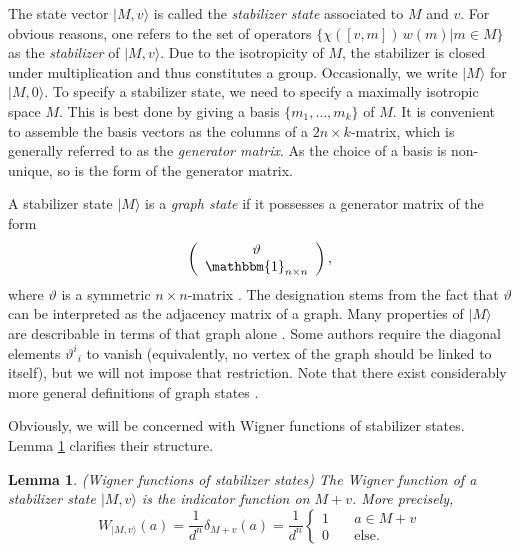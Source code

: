 \documentclass[aps,twocolumn,floatfix]{revtex4}
\newtheorem{lemma}[theorem]{Lemma}
\def\ket#1.{|#1\rangle}
\def\Id{\mathbbm{1}}
\begin{document}
The state vector $\ket M,v.$ is called the \emph{stabilizer state}
associated to $M$ and $v$. For obvious reasons, one refers to the set
of operators $\{\chi([v,m])\,w(m)|m\in M\}$ as the \emph{stabilizer}
of $\ket M,v.$. Due to the isotropicity of $M$, the stabilizer is
closed under multiplication and thus constitutes a group.
Occasionally, we write $\ket M.$ for $\ket M, 0.$. To specify a
stabilizer state, we need to specify a maximally isotropic space $M$.
This is best done by giving a basis $\{m_1, \dots, m_k\}$ of $M$.  It
is convenient to assemble the basis vectors as the columns of a
$2n\times k$-matrix, which is generally referred to as the
\emph{generator matrix}. As the choice of a basis is non-unique, so is
the form of the generator matrix.

A stabilizer state $\ket M.$ is a \emph{graph state} if it possesses a
generator matrix of the form 
\begin{equation}\label{graphState} 
	\left(
		\begin{array}{c} 
			\vartheta \\ 
			\Id_{n\times n}
		\end{array} 
	\right),
\end{equation} 
where $\vartheta$ is a symmetric $n\times n$-matrix \cite{jensGraph}. The
designation stems from the fact that $\vartheta$ can be interpreted as
the adjacency matrix of a graph. Many properties of $\ket M.$ are
describable in terms of that graph alone \cite{jensGraph}.
Some authors require the diagonal elements ${\vartheta^i}_i$ to vanish
(equivalently, no vertex of the graph should be linked to itself), but
we will not impose that restriction. Note that there exist
considerably more general definitions of graph states
\cite{schlinge}.

Obviously, we will be concerned with Wigner functions of stabilizer
states. Lemma \ref{lmStabilizerWigner} clarifies their structure.

\begin{lemma}\label{lmStabilizerWigner}
	\emph{(Wigner functions of stabilizer states)}
	The Wigner function of a stabilizer state $\ket M, v.$ is the
	\emph{indicator function} on $M+v$. More precisely,
	\begin{equation*}
		W_{\ket M, v.}(a) = 
		\frac1{d^n} \delta_{M+v}(a) =
		\frac1{d^n} 
			\left\{
				\begin{array}{ll}
					1\quad	&	a \in M+v \\
					0 			& \mathrm{else}.
				\end{array}
			\right.
	\end{equation*}
\end{lemma}
\end{document}
